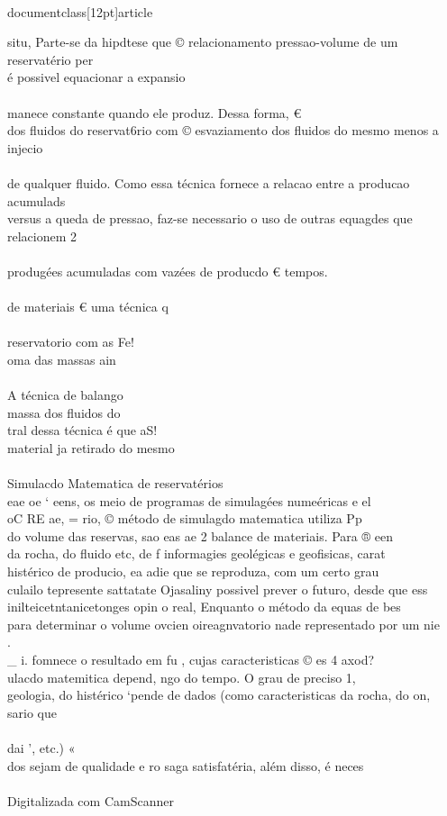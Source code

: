\\documentclass[12pt]{article}
\begin{document}
situ, Parte-se da hipdtese que © relacionamento pressao-volume de um reservatério per\\
é possivel equacionar a expansio\\
\\
manece constante quando ele produz. Dessa forma, €\\
dos fluidos do reservat6rio com © esvaziamento dos fluidos do mesmo menos a injecio\\
\\
de qualquer fluido. Como essa técnica fornece a relacao entre a producao acumulads\\
versus a queda de pressao, faz-se necessario o uso de outras equagdes que relacionem 2\\
\\
produgées acumuladas com vazées de producdo € tempos.\\
\\
de materiais € uma técnica q\\
\\
reservatorio com as Fe!\\
oma das massas ain\\
\\
A técnica de balango\\
massa dos fluidos do\\
tral dessa técnica é que aS!\\
material ja retirado do mesmo\\
\\
Simulacdo Matematica de reservatérios\\
eae oe ‘ eens, os meio de programas de simulagées numeéricas e el\\
oC RE ae, = rio, © método de simulagdo matematica utiliza Pp\\
do volume das reservas, sao eas ae 2 balance de materiais. Para ® een\\
da rocha, do fluido etc, de f informagies geolégicas e geofisicas, carat\\
histérico de producio, ea adie que se reproduza, com um certo grau\\
culailo tepresente sattatate Ojasaliny possivel prever o futuro, desde que ess\\
inilteicetntanicetonges opin o real, Enquanto o método da equas de bes\\
para determinar o volume ovcien oireagnvatorio nade representado por um nie\\
. \\_ i. fomnece o resultado em fu , cujas caracteristicas © es 4 axod?\\
ulacdo matemitica depend, ngo do tempo. O grau de preciso 1,\\
geologia, do histérico ‘pende de dados (como caracteristicas da rocha, do on,\\
sario que\\
\\
dai ', etc.) «\\
dos sejam de qualidade e ro saga satisfatéria, além disso, é neces\\
\\
Digitalizada com CamScanner\\
\end{document}
